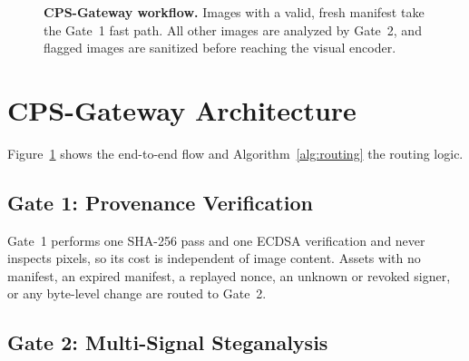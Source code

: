 \documentclass[conference]{IEEEtran}
\begin{document}
\begin{figure}[t]
\caption{\textbf{CPS-Gateway workflow.} Images with a valid, fresh manifest take the Gate~1 fast path. All other images are analyzed by Gate~2, and flagged images are sanitized before reaching the visual encoder.}
\label{fig:workflow}
\end{figure}

\section{CPS-Gateway Architecture}
\label{sec:architecture}

Figure~\ref{fig:workflow} shows the end-to-end flow and Algorithm~\ref{alg:routing} the routing logic.

\subsection{Gate 1: Provenance Verification}
Gate~1 performs one SHA-256 pass and one ECDSA verification and never inspects pixels, so its cost is independent of image content. Assets with no manifest, an expired manifest, a replayed nonce, an unknown or revoked signer, or any byte-level change are routed to Gate~2.

\subsection{Gate 2: Multi-Signal Steganalysis}
\end{document}
